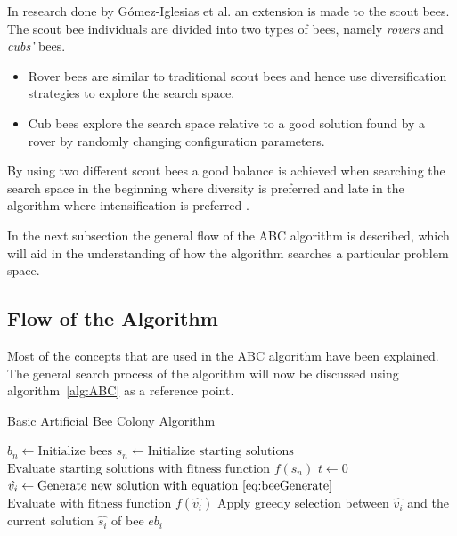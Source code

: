 In research done by G\'{o}mez-Iglesias et al. \cite{ABCFusionGrid} an extension is made to the scout bees. The scout bee individuals are divided into two types of bees, namely \emph{rovers} and \emph{cubs'} bees\cite{ABCFusionGrid}.
\begin{itemize}
\item{Rover bees} are similar to traditional scout bees and hence use diversification strategies to explore the search space. 
\item {Cub bees} explore the search space relative to a good solution found by a rover by randomly changing configuration parameters. 
\end{itemize}
By using two different scout bees a good balance is achieved when searching the search space in the beginning where diversity is preferred and late in the algorithm where intensification is preferred \cite{ABCFusionGrid}.

In the next subsection the general flow of the \gls{ABC} algorithm is described, which will aid in the understanding of how the algorithm searches a particular problem space. 
\subsection{Flow of the Algorithm}
Most of the concepts that are used in the \gls{ABC} algorithm have been explained. The general search process of the algorithm will now be discussed using algorithm~\ref{alg:ABC} as a reference point.
\begin{algorithm}[H]
\caption{Basic Artificial Bee Colony Algorithm\cite{ABCCompareStudy}}
\label{alg:ABC}
	\begin{algorithmic}[1]
		\State$b_n \leftarrow \text{Initialize bees}$
		\State$s_n \leftarrow \text{Initialize starting solutions}$
		\State$\text{Evaluate starting solutions with fitness function $f(s_n)$}$
		\State$t \leftarrow 0$
				\State$\hat{v_i} \leftarrow \text{Generate new solution with equation~\ref{eq:beeGenerate}}$
				\State$\text{Evaluate with fitness function $f(\hat{v_i})$}$
				\State Apply greedy selection between $\hat{v_i}$ and the current solution $\hat{s_i}$ of bee $eb_i$
			\EndFor
	\end{algorithmic}
\addtocounter{algorithm}{-1}
\end{algorithm}

